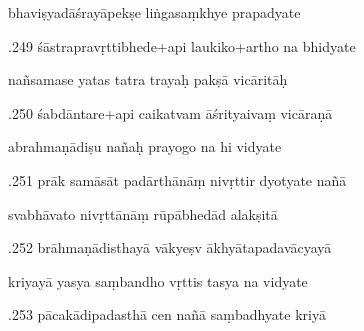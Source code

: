 \documentclass[article,12pt,a4paper]{memoir}%
\newcounter{parCount}
\begin{document}
	  
	  \pstart \leavevmode%
	bhaviṣyadāśrayāpekṣe liṅgasaṃkhye prapadyate 
	{}
	\pend%
      

	  
	  \pstart {}.249 śāstrapravṛttibhede+api laukiko+artho na bhidyate 
	{}
	\pend%
      

	  
	  \pstart \leavevmode%
	nañsamase yatas tatra trayaḥ pakṣā vicāritāḥ 
	{}
	\pend%
      

	  
	  \pstart {}.250 śabdāntare+api caikatvam āśrityaivaṃ vicāraṇā 
	{}
	\pend%
      

	  
	  \pstart \leavevmode%
	abrahmaṇādiṣu nañaḥ prayogo na hi vidyate 
	{}
	\pend%
      

	  
	  \pstart {}.251 prāk samāsāt padārthānāṃ nivṛttir dyotyate nañā 
	{}
	\pend%
      

	  
	  \pstart \leavevmode%
	svabhāvato nivṛttānāṃ rūpābhedād alakṣitā 
	{}
	\pend%
      

	  
	  \pstart {}.252 brāhmaṇādisthayā vākyeṣv   ākhyātapadavācyayā 
	{}
	\pend%
      

	  
	  \pstart \leavevmode%
	kriyayā yasya saṃbandho vṛttis tasya na vidyate 
	{}
	\pend%
      

	  
	  \pstart {}.253 pācakādipadasthā cen nañā saṃbadhyate kriyā 
	{}
	\pend%
      
\end{document}
